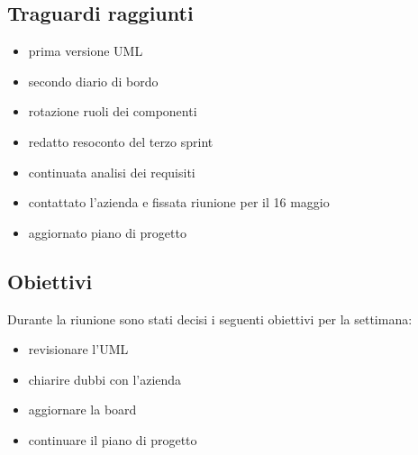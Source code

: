 \documentclass[12pt]{article}
\begin{document}
\subsection{Traguardi raggiunti}
\begin{itemize}
    \item prima versione UML
    \item secondo diario di bordo
    \item rotazione ruoli dei componenti
    \item redatto resoconto del terzo sprint
    \item continuata analisi dei requisiti
    \item contattato l'azienda e fissata riunione per il 16 maggio
    \item aggiornato piano di progetto
\end{itemize}

\subsection{Obiettivi}
Durante la riunione sono stati decisi i seguenti obiettivi per la settimana:
\begin{itemize}
    \item revisionare l'UML
    \item chiarire dubbi con l'azienda
    \item aggiornare la board
    \item continuare il piano di progetto
\end{itemize}
\end{document}
